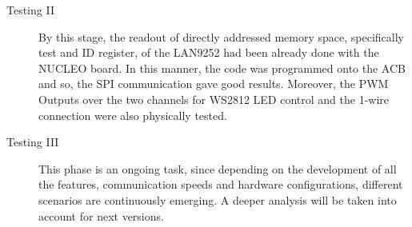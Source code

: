 \begin{description}
\item[Testing II] By this stage, the readout of directly addressed memory space, specifically test and ID register, of the LAN9252 had been already done
                    with the NUCLEO board. In this manner, the code was programmed onto the ACB and so, the SPI communication gave good results. Moreover,
                    the PWM Outputs over the two channels for WS2812 LED control and the 1-wire connection were also physically tested.  
\item[Testing III] This phase is an ongoing task, since depending on the development of all the features, communication speeds and hardware 
                configurations, different scenarios are continuously emerging. A deeper analysis will be taken into account for next versions.
\end{description}



